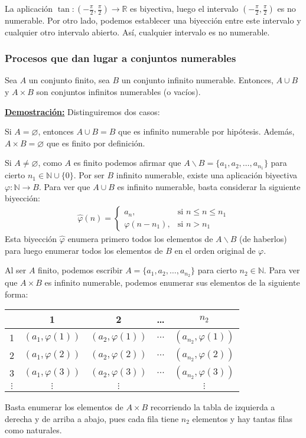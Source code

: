 \documentclass[12pt,a4paper]{article}
\newcommand{\R}{\mathbb{R}}
\newcommand{\N}{\mathbb{N}}
\newcounter{unit}[section]
\newcounter{chapter}[unit]
\renewcommand{\theunit}{\arabic{unit}}
\renewcommand{\thechapter}{\arabic{chapter}}
\renewcommand{\thesubsubsection}{\theunit.\thechapter.\arabic{subsubsection}}
\newcommand{\result}[1]{%
  \subsubsection{#1}%
  \label{result:\thesubsubsection}
}
\newcommand{\dem}{
    \noindent \underline{\textbf{Demostración:}}
}
\begin{document}
\vspace{6mm}
La aplicación $\tan : (-\frac{\pi}{2}, \frac{\pi}{2}) \longrightarrow \R$ es biyectiva, luego el intervalo
$(-\frac{\pi}{2}, \frac{\pi}{2})$ es no numerable. Por otro lado, podemos establecer una biyección entre
este intervalo y cualquier otro intervalo abierto. Así, cualquier intervalo es no numerable.

\result{Procesos que dan lugar a conjuntos numerables}
\hspace{3mm}
Sea $A$ un conjunto finito, sea $B$ un conjunto infinito numerable. Entonces,
$A \cup B$ y $A \times B$ son conjuntos infinitos numerables (o vacíos).

\vspace{4mm}
\dem Distinguiremos dos casos:

\vspace{2mm}
Si $A = \varnothing$, entonces $A \cup B = B$ que es infinito numerable por hipótesis.
Además, $A \times B = \varnothing$ que es finito por definición.

\vspace{4mm}
Si $A \neq \varnothing$, como $A$ es finito podemos afirmar que $A\backslash B = \{a_1, a_2, \ldots, a_{n_1}\}$
para cierto $n_1 \in \N \cup \{0\}$. Por ser $B$ infinito numerable, existe una aplicación biyectiva $\varphi : \N \to B$.
Para ver que $A \cup B$ es infinito numerable, basta considerar la siguiente biyección:
\begin{align*}
    \hat{\varphi} (n) = \begin{cases}
    a_n, & \text{si } n \leq n \leq n_1 \\
    \varphi(n - n_1), & \text{si } n > n_1
    \end{cases}
\end{align*}
Esta biyección $\hat{\varphi}$ enumera primero todos los elementos de $A \backslash B$ (de haberlos)
para luego enumerar todos los elementos de $B$ en el orden original de $\varphi$.

\vspace{4mm}
Al ser $A$ finito, podemos escribir $A = \{a_1, a_2, \ldots, a_{n_2}\}$ para cierto $n_2 \in \N$.
Para ver que $A \times B$ es infinito numerable, podemos enumerar sus elementos de la siguiente forma:
\begin{center}
\begin{tabular}{c|cccc}
    & 1 & 2 & \ldots & $n_2$ \\
    \hline
    1 & $(a_1, \varphi(1))$ & $(a_2, \varphi(1))$ & $\ldots$ & $(a_{n_2}, \varphi(1))$ \\
    2 & $(a_1, \varphi(2))$ & $(a_2, \varphi(2))$ & $\ldots$ & $(a_{n_2}, \varphi(2))$ \\
    3 & $(a_1, \varphi(3))$ & $(a_2, \varphi(3))$ & $\ldots$ & $(a_{n_2}, \varphi(3))$ \\
    $\vdots$ & $\vdots$ & $\vdots$ & & $\vdots$ \\
\end{tabular}
\end{center}
\vspace{2mm}
Basta enumerar los elementos de $A \times B$ recorriendo la tabla de izquierda a derecha y de arriba a abajo,
pues cada fila tiene $n_2$ elementos y hay tantas filas como naturales.
\end{document}
